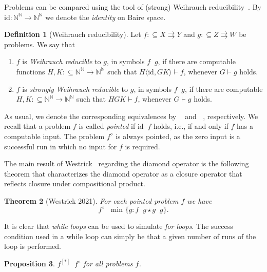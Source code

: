 \documentclass[11pt,a4paper]{amsart}
\theoremstyle{plain}
\newtheorem{thm}{Theorem}[section]
\newtheorem{prop}[thm]{Proposition}
\theoremstyle{definition}
\newtheorem{defi}[thm]{Definition}
\theoremstyle{defC}
\theoremstyle{thmC}
\theoremstyle{plain}
\numberwithin{equation}{section}
\def\IN{{\mathbb{N}}}
\def\In{\subseteq}
\def\mto{\rightrightarrows}
\def\leqW{\mathop{\leq_{\mathrm{W}}}}
\def\equivW{\mathop{\equiv_{\mathrm{W}}}}
\def\leqSW{\mathop{\leq_{\mathrm{sW}}}}
\def\equivSW{\mathop{\equiv_{\mathrm{sW}}}}
\def\leqW{\mathop{\leq_{\mathrm{W}}}}
\def\equivW{\mathop{\equiv_{\mathrm{W}}}}
\def\leqSW{\mathop{\leq_{\mathrm{sW}}}}
\def\equivSW{\mathop{\equiv_{\mathrm{sW}}}}
\def\id{{\mathrm{id}}}
\begin{document}
Problems can be compared using the tool of (strong) Weihrauch reducibility~\cite{BGP21}.
By $\id:\IN^\IN\to\IN^\IN$ we denote the {\em identity} on Baire space.

\begin{defi}[Weihrauch reducibility]
Let $f:\In X\mto Y$ and $g:\In Z\mto W$ be problems. We say that
\begin{enumerate}
\item $f$ is {\em Weihrauch reducible} to $g$, in symbols $f\leqW g$, if there are computable functions
         ${H,K:\In\IN^\IN\to\IN^\IN}$ such that $H\langle\id,GK\rangle\vdash f$, whenever $G\vdash g$ holds. 
\item $f$ is {\em strongly Weihrauch reducible} to $g$, in symbols $f\leqSW g$, if there are computable
         $H,K:\In\IN^\IN\to\IN^\IN$ such that $HGK\vdash f$, whenever $G\vdash g$ holds. 
\end{enumerate}
\end{defi}

\noindent
As usual, we denote the corresponding equivalences by $\equivW$ and $\equivSW$, respectively. 
We recall that a problem $f$ is called {\em pointed} if $\id\leqW f$ holds, i.e., if and only if $f$ has a computable input.
The problem $f^\diamond$ is always pointed, as the zero input is a successful run in which no input for $f$ is required.

The main result of Westrick~\cite{Wes21} regarding the diamond operator is the following theorem
that characterizes the diamond operator as a closure operator that reflects closure under
compositional product.

\begin{thm}[Westrick 2021]
\label{them:Westrick}
For each pointed problem $f$ we have
\[f^\diamond\equivW\min\nolimits_{\leqW}\{g:f\leqW g\star g\leqW g\}.\]
\end{thm}

\noindent
It is clear that {\em while loops} can be used to simulate {\em for loops}. 
The success condition used in a while loop can simply be that a given number
of runs of the loop is performed.

\begin{prop}
\label{prop:for-while}
$f^{[*]}\leqSW f^\diamond$ for all problems $f$.
\end{prop}
\end{document}
